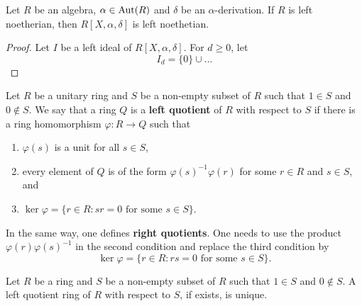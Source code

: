 \begin{theorem}
    Let $R$ be an algebra, $\alpha\in\operatorname{Aut}(R)$ and $\delta$ be an $\alpha$-derivation. If $R$ 
    is left noetherian, then $R[X,\alpha,\delta]$ is left noethetian. 
\end{theorem}

\begin{proof}
    Let $I$ be a left ideal of $R[X,\alpha,\delta]$. For $d\geq0$, let 
    \[
    I_d=\{0\}\cup...
    \]
\end{proof}


\begin{definition}
    Let $R$ be a unitary ring and $S$ be a non-empty subset of $R$ such that 
    $1\in S$ and $0\not\in S$. We say that a ring $Q$ is a 
    \textbf{left quotient} of $R$ with respect to $S$ if there is 
    a ring homomorphism $\varphi\colon R\to Q$ such that
    \begin{enumerate}
        \item $\varphi(s)$ is a unit for all $s\in S$, 
        \item every element of $Q$ is of the form $\varphi(s)^{-1}\varphi(r)$ 
        for some $r\in R$ and $s\in S$, and 
        \item $\ker\varphi=\{r\in R:sr=0\text{ for some $s\in S$}\}$. 
    \end{enumerate}
\end{definition}

In the same way, one defines \textbf{right quotients}. One needs to use 
the product $\varphi(r)\varphi(s)^{-1}$ in the second condition and 
replace the third condition 
by 
\[
\ker\varphi=\{r\in R:rs=0\text{ for some $s\in S$}\}. 
\]  

\begin{exercise}
    Let $R$ be a ring and $S$ be a non-empty subset of $R$ such that 
    $1\in S$ and $0\not\in S$. A left quotient ring of $R$ with respect to $S$, if exists, is unique. 
\end{exercise}


